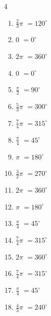 \begin{multicols}{4}
\begin{enumerate}
  \item $\displaystyle \frac{2}{3}\pi$
        $\displaystyle =120^{\circ}$

  \item $\displaystyle 0$
        $\displaystyle =0^{\circ}$

  \item $\displaystyle 2\pi$
        $\displaystyle =360^{\circ}$

  \item $\displaystyle 0$
        $\displaystyle =0^{\circ}$

  \item $\displaystyle \frac{\pi}{2}$
        $\displaystyle =90^{\circ}$

  \item $\displaystyle \frac{5}{3}\pi$
        $\displaystyle =300^{\circ}$

  \item $\displaystyle \frac{7}{4}\pi$
        $\displaystyle =315^{\circ}$

  \item $\displaystyle \frac{\pi}{4}$
        $\displaystyle =45^{\circ}$

  \item $\displaystyle \pi$
        $\displaystyle =180^{\circ}$

  \item $\displaystyle \frac{3}{2}\pi$
        $\displaystyle =270^{\circ}$

  \item $\displaystyle 2\pi$
        $\displaystyle =360^{\circ}$

  \item $\displaystyle \pi$
        $\displaystyle =180^{\circ}$

  \item $\displaystyle \frac{\pi}{4}$
        $\displaystyle =45^{\circ}$

  \item $\displaystyle \frac{7}{4}\pi$
        $\displaystyle =315^{\circ}$

  \item $\displaystyle 2\pi$
        $\displaystyle =360^{\circ}$

  \item $\displaystyle \frac{7}{4}\pi$
        $\displaystyle =315^{\circ}$

  \item $\displaystyle \frac{\pi}{4}$
        $\displaystyle =45^{\circ}$

  \item $\displaystyle \frac{4}{3}\pi$
        $\displaystyle =240^{\circ}$


\end{enumerate}
\end{multicols}
